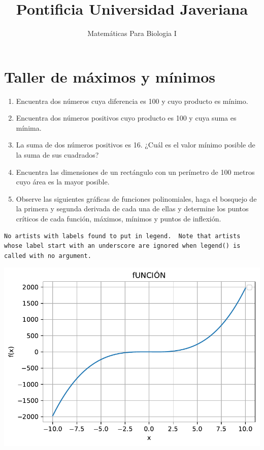 \documentclass[
]{article}
\title{Pontificia Universidad Javeriana}
\author{Matemáticas Para Biologia I}
\date{}
\begin{document}
\maketitle


\section{Taller de máximos y
mínimos}\label{taller-de-muxe1ximos-y-muxednimos}

\begin{enumerate}
\def\labelenumi{\arabic{enumi}.}
\item
  Encuentra dos números cuya diferencia es 100 y cuyo producto es
  mínimo.
\item
  Encuentra dos números positivos cuyo producto es 100 y cuya suma es
  mínima.
\item
  La suma de dos números positivos es 16. ¿Cuál es el valor mínimo
  posible de la suma de sus cuadrados?
\item
  Encuentra las dimensiones de un rectángulo con un perímetro de 100
  metros cuyo área es la mayor posible.
\item
  Observe las siguientes gráficas de funciones polinomiales, haga el
  bosquejo de la primera y segunda derivada de cada una de ellas y
  determine los puntos críticos de cada función, máximos, mínimos y
  puntos de inflexión.
\end{enumerate}

\begin{verbatim}
No artists with labels found to put in legend.  Note that artists whose label start with an underscore are ignored when legend() is called with no argument.
\end{verbatim}

\includegraphics{taller_maximos_files/figure-pdf/cell-2-output-2.pdf}
\end{document}
